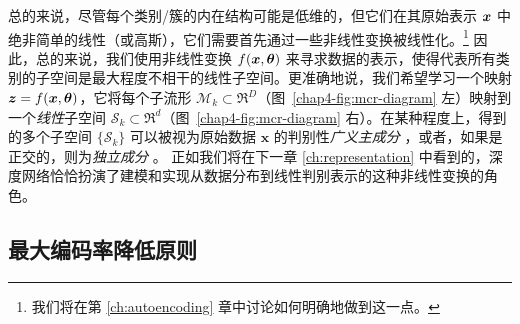 \documentclass[../../book-main_zh.tex]{subfiles}
\begin{document}
总的来说，尽管每个类别/簇的内在结构可能是低维的，但它们在其原始表示 $\bm{x}$ 中绝非简单的线性（或高斯），它们需要首先通过一些非线性变换被线性化。\footnote{我们将在第 \ref{ch:autoencoding} 章中讨论如何明确地做到这一点。} 因此，总的来说，我们使用非线性变换 $f(\bm{x},\bm\theta)$ 来寻求数据的表示，使得代表所有类别的子空间是最大程度不相干的线性子空间。更准确地说，我们希望学习一个映射 {$\bm{z} = f(\bm{x},\bm\theta)$}，它将每个子流形 $\mathcal{M}_k \subset \Re^D$（图~\ref{chap4-fig:mcr-diagram} 左）映射到一个{\em 线性}子空间 $\mathcal{S}_k \subset \Re^d$（图~\ref{chap4-fig:mcr-diagram} 右）。在某种程度上，得到的多个子空间 $\{\mathcal{S}_k\}$ 可以被视为原始数据 $\bm x$ 的判别性{\em 广义主成分} \cite{GPCA}，或者，如果是正交的，则为{\em 独立成分} \cite{hyvarinen2000independent}。
正如我们将在下一章 \ref{ch:representation} 中看到的，深度网络恰恰扮演了建模和实现从数据分布到线性判别表示的这种非线性变换的角色。


\subsection{最大编码率降低原则}\label{subsec:MCR2}



\end{document}
